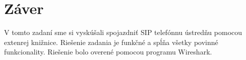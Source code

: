 \documentclass[10pt,oneside,slovak,a4paper]{article}
\begin{document}
\section{Záver}
V tomto zadaní sme si vyskúšali spojazdniť SIP telefónnu ústredňu pomocou extenrej knižnice. Riešenie zadania je funkčné a spĺňa všetky povinné funkcionality. Riešenie bolo overené pomocou programu Wireshark.  
\end{document}
